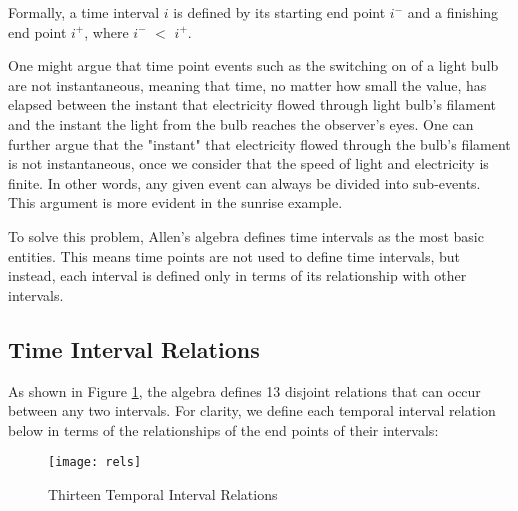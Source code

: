 \documentclass[11pt]{report}
\begin{document}
        Formally, a time interval $i$ is defined by its starting end point ${i^-}$ and
        a finishing end point ${i^+}$, where ${i^-}$ $<$ ${i^+}$.

        One might argue that time point events such as the switching on of a light bulb
        are not instantaneous, meaning that time, no matter how small the value, has
        elapsed between the instant that electricity flowed through light bulb's
        filament and the instant the light from the bulb reaches the observer's eyes.
        One can further argue that the "instant" that electricity flowed through the
        bulb's filament is not instantaneous, once we consider that the speed of light
        and electricity is finite. In other words, any given event can always be
        divided into sub-events. This argument is more evident in the sunrise example.

        To solve this problem, Allen's algebra defines time intervals as the most basic
        entities. This means time points are not used to define time intervals, but
        instead, each interval is defined only in terms of its relationship with other
        intervals.

      \subsection{Time Interval Relations}

        As shown in Figure \ref{fig-rels}, the algebra defines 13 disjoint relations
        that can occur between any two intervals. For clarity, we define each temporal
        interval relation below in terms of the relationships of the end points of
        their intervals:

        \begin{figure}[[tbhp]
          \begin{center}
            \texttt{[image: rels]}
            \caption{Thirteen Temporal Interval Relations}
            \label{fig-rels}
          \end{center}
        \end{figure}
\end{document}

